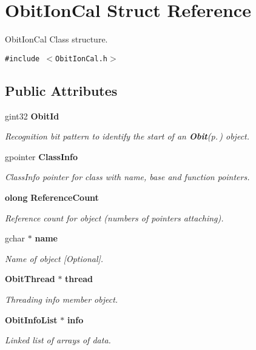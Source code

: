 \section{Obit\-Ion\-Cal Struct Reference}
\label{structObitIonCal}
Obit\-Ion\-Cal Class structure.  


{\tt \#include $<$Obit\-Ion\-Cal.h$>$}

\subsection*{Public Attributes}
\begin{CompactItemize}
\item 
gint32 {\bf Obit\-Id}
\begin{CompactList}\small\item\em Recognition bit pattern to identify the start of an {\bf Obit}{\rm (p.\,\pageref{structObit})} object. \item\end{CompactList}\item 
gpointer {\bf Class\-Info}
\begin{CompactList}\small\item\em Class\-Info pointer for class with name, base and function pointers. \item\end{CompactList}\item 
{\bf olong} {\bf Reference\-Count}
\begin{CompactList}\small\item\em Reference count for object (numbers of pointers attaching). \item\end{CompactList}\item 
gchar $\ast$ {\bf name}
\begin{CompactList}\small\item\em Name of object [Optional]. \item\end{CompactList}\item 
{\bf Obit\-Thread} $\ast$ {\bf thread}
\begin{CompactList}\small\item\em Threading info member object. \item\end{CompactList}\item 
{\bf Obit\-Info\-List} $\ast$ {\bf info}
\begin{CompactList}\small\item\em Linked list of arrays of data. \item\end{CompactList}\item 

\end{CompactItemize}
